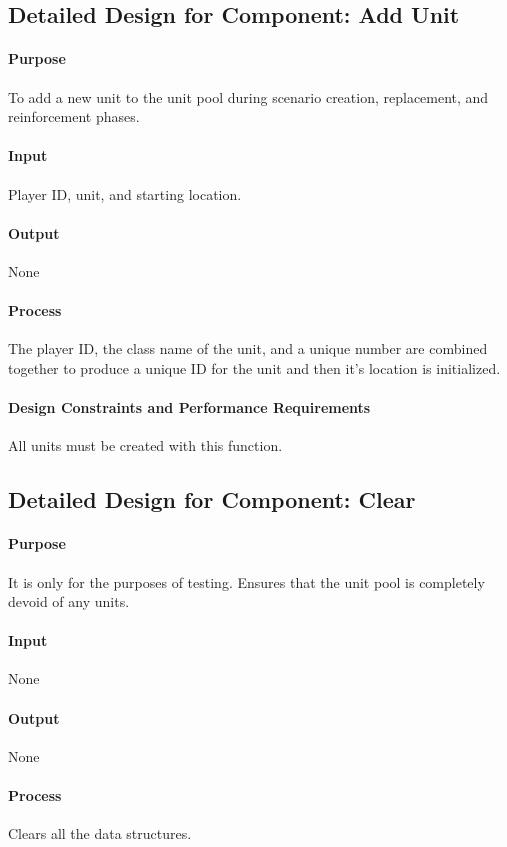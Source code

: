 \documentclass[12pt,a4paper,titlepage]{article}
\begin{document}
\subsection{Detailed Design for Component: Add Unit}
\paragraph{Purpose} To add a new unit to the unit pool during scenario creation, replacement, and reinforcement phases.
\paragraph{Input} Player ID, unit, and starting location.
\paragraph{Output} None
\paragraph{Process} The player ID, the class name of the unit, and a unique number are combined together to produce a unique ID for the unit and then it's location is initialized.
\paragraph{Design Constraints and Performance Requirements} All units must be created with this function.

\subsection{Detailed Design for Component: Clear}
\paragraph{Purpose} It is only for the purposes of testing. Ensures that the unit pool is completely devoid of any units.
\paragraph{Input} None
\paragraph{Output} None
\paragraph{Process} Clears all the data structures.
\end{document}
